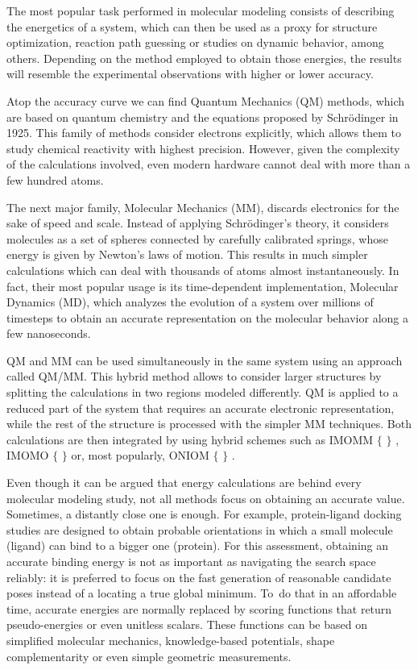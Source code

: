 The most popular task performed in molecular modeling consists of describing the energetics of a system, which can then be used as a proxy for structure optimization, reaction path guessing or studies on dynamic behavior, among others. Depending on the method employed to obtain those energies, the results will resemble the experimental observations with higher or lower accuracy.

Atop the accuracy curve we can find Quantum Mechanics (QM) methods, which are based on quantum chemistry and the equations proposed by Schrödinger in 1925. This family of methods consider electrons explicitly, which allows them to study chemical reactivity with highest precision. However, given the complexity of the calculations involved, even modern hardware cannot deal with more than a few hundred atoms.

The next major family, Molecular Mechanics (MM), discards electronics for the sake of speed and scale. Instead of applying Schrödinger’s theory, it considers molecules as a set of spheres connected by carefully calibrated springs, whose energy is given by Newton’s laws of motion. This results in much simpler calculations which can deal with thousands of atoms almost instantaneously. In fact, their most popular usage is its time-dependent implementation, Molecular Dynamics (MD), which analyzes the evolution of a system over millions of timesteps to obtain an accurate representation on the molecular behavior along a few nanoseconds.

QM and MM can be used simultaneously in the same system using an approach called QM/MM. This hybrid method allows to consider larger structures by splitting the calculations in two regions modeled differently. QM is applied to a reduced part of the system that requires an accurate electronic representation, while the rest of the structure is processed with the simpler MM techniques. Both calculations are then integrated by using hybrid schemes such as IMOMM $ \{ $ $ \} $ , IMOMO $ \{ $ $ \} $  or, most popularly, ONIOM $ \{ $ $ \} $ .

Even though it can be argued that energy calculations are behind every molecular modeling study, not all methods focus on obtaining an accurate value. Sometimes, a distantly close one is enough. For example, protein-ligand docking studies are designed to obtain probable orientations in which a small molecule (ligand) can bind to a bigger one (protein). For this assessment, obtaining an accurate binding energy is not as important as navigating the search space reliably: it is preferred to focus on the fast generation of reasonable candidate poses instead of a locating a true global minimum. To\ do that in an affordable time, accurate energies are normally replaced by scoring functions that return pseudo-energies or even unitless scalars. These functions can be based on simplified molecular mechanics, knowledge-based potentials, shape complementarity or even simple geometric measurements.


